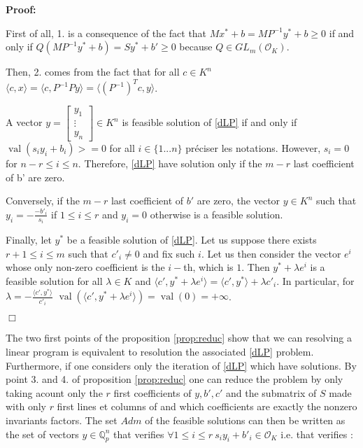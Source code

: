\documentclass[a4paper,12pt]{article}
\newenvironment{proof}{\hbox{}\vspace{-0.5cm} {\bf Proof:}}{\hfill $\Box$ \\}
\newcommand{\corentin}[1]{{\color{red} #1}} %
\DeclareMathOperator{\val}{val}
\newcommand{\OK}{\mathcal{O}_K}
\begin{document}
\begin{proof}

  First of all, 1. is a consequence of the fact that $Mx^*+b = MP^{-1}y^* +b\geq 0$ if and only if $Q(MP^{-1}y^* + b) = Sy^* + b' \geq 0$ because $Q \in GL_m(\OK)$.

  Then, 2. comes from the fact that for all $c \in K^n$ $\langle c, x\rangle = \langle c, P^{-1}Py \rangle = \langle \left(P^{-1}\right)^T c, y \rangle$.

  A vector $y =  \left[\begin{smallmatrix} y_1 \\ \vdots \\ y_n \end{smallmatrix}\right] \in K^n$ is feasible solution of \ref{dLP} if and only if $\val(s_i y_i + b_i) >=0$ for all $i \in \{1...n\}$ \corentin{préciser les notations}. 
  However, $s_i =0$ for $n-r \leq i\leq n$. Therefore, \ref{dLP} have solution only if the $m-r$ last coefficient of b' are zero.
  
  Conversely, if the $m-r$ last coefficient of $b'$ are zero, the vector $y \in K^n$ such that $y_i = -\frac{-b'_i}{s_i}$ if $1 \leq i \leq r$ and $y_i =0$ otherwise is a feasible solution.

  Finally, let $y^*$ be a feasible solution of \ref{dLP}. Let us suppose there exists $r+1 \leq i \leq m$ such that $c'_i \neq  0$ and fix such $i$. Let us then consider the vector $e^i$ whose only non-zero coefficient is the $i-$th, which is $1$. Then $y^*+\lambda e^i$ is a feasible solution for all $\lambda \in K$ and $\langle c', y^* + \lambda e^i\rangle = \langle c' , y^* \rangle + \lambda c'_i$. In particular, for $\lambda = -\frac{\langle c', y^* \rangle}{c'_i}$ $\val \left( \langle c', y^* + \lambda e ^i \rangle\right) = \val (0) = + \infty$. 

\end{proof}

The two first points of the proposition \ref{prop:reduc} show that we can resolving a linear program is equivalent to resolution the associated \ref{dLP} problem. Furthermore, if one considers only the iteration of \ref{dLP} which have solutions. By point 3. and 4. of proposition \ref{prop:reduc} one can reduce the problem by only taking acount only the $r$ first coefficients of $y, b', c'$ and the submatrix of $S$ made with only $r$ first lines et columns of and which coefficients are exactly the nonzero invariants factors. The set $Adm$ of the feasible solutions can then be written as the set of vectors $y \in \mathbb{Q}_{ p } ^n$ that verifies $\forall 1 \le i\le r \ s_i y_i + b'_i \in \OK$ i.e. that verifies :
\end{document}
